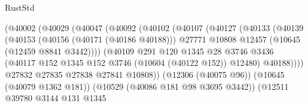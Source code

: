 \begin{lexlean}{RustStd}
\begin{coremodule}
                                      (@40002
                                        (@40029
                                          (@40047
                                            (@40092
                                              (@40102
                                                (@40107
                                                  (@40127
                                                    (@40133
                                                      (@40139
                                                        (@40153
                                                          (@40156 (@40171 (@40186 @40188)))
                                                          @27771
                                                          @10808
                                                          @12457
                                                          (@10645 (@12459 @8841 @3442))))
                                                      (@40109
                                                        @291
                                                        @120
                                                        @1345
                                                        @28
                                                        @3746
                                                        @3436
                                                        (@40117
                                                          @152
                                                          @1345
                                                          @152
                                                          @3746
                                                          (@10604 (@40122 @152))
                                                          @12480)
                                                        @40188))))
                                                @27832
                                                @27835
                                                @27838
                                                @27841
                                                @10808))
                                            (@12306 (@40075 @96))
                                            (@10645 (@40079 @1362 @181))
                                            (@10529 (@40086 @181 @98 @3695 @3442))
                                            (@12511
                                              @39780
                                              @3144
                                              @131
                                              @1345

\end{coremodule}
\end{lexlean}
